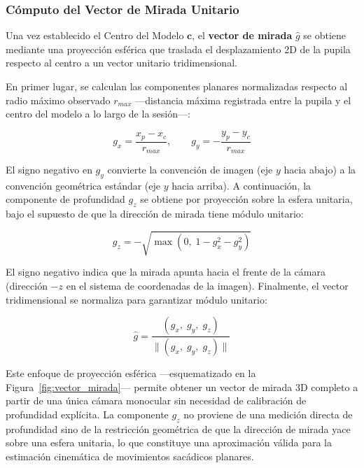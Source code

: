 \subsubsection{Cómputo del Vector de Mirada Unitario}

Una vez establecido el Centro del Modelo $\mathbf{c}$, el \textbf{vector de mirada} $\hat{g}$ se obtiene mediante una proyección esférica que traslada el desplazamiento 2D de la pupila respecto al centro a un vector unitario tridimensional.

En primer lugar, se calculan las componentes planares normalizadas respecto al radio máximo observado $r_{max}$ —distancia máxima registrada entre la pupila y el centro del modelo a lo largo de la sesión—:

\begin{equation}
	g_x = \frac{x_p - x_c}{r_{max}}, \qquad g_y = -\frac{y_p - y_c}{r_{max}}
	\label{eq:gaze_xy}
\end{equation}

El signo negativo en $g_y$ convierte la convención de imagen (eje $y$ hacia abajo) a la convención geométrica estándar (eje $y$ hacia arriba). A continuación, la componente de profundidad $g_z$ se obtiene por proyección sobre la esfera unitaria, bajo el supuesto de que la dirección de mirada tiene módulo unitario:

\begin{equation}
	g_z = -\sqrt{\max\!\left(0,\; 1 - g_x^2 - g_y^2\right)}
	\label{eq:gaze_z}
\end{equation}

El signo negativo indica que la mirada apunta hacia el frente de la cámara (dirección $-z$ en el sistema de coordenadas de la imagen). Finalmente, el vector tridimensional se normaliza para garantizar módulo unitario:

\begin{equation}
	\hat{g} = \frac{(g_x,\; g_y,\; g_z)}{\|(g_x,\; g_y,\; g_z)\|}
	\label{eq:gaze_norm}
\end{equation}

Este enfoque de proyección esférica —esquematizado en la Figura~\ref{fig:vector_mirada}— permite obtener un vector de mirada 3D completo a partir de una única cámara monocular sin necesidad de calibración de profundidad explícita. La componente $g_z$ no proviene de una medición directa de profundidad sino de la restricción geométrica de que la dirección de mirada yace sobre una esfera unitaria, lo que constituye una aproximación válida para la estimación cinemática de movimientos sacádicos planares.

